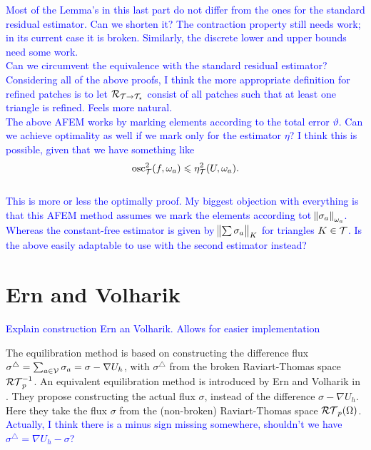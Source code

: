 \documentclass[thesis.tex]{subfiles}
\begin{document}
\textcolor{blue}{
  Most of the Lemma's in this last part do not differ from the ones for the standard residual estimator. Can we
  shorten it? The contraction property still needs work; in its current case it is broken.  Similarly,
  the discrete lower and upper bounds need some work. 
  \\
  Can we circumvent the equivalence with the standard residual estimator?
  \\
  Considering all of the above proofs, I think the more appropriate definition for refined patches is to let 
  $\mathcal{R}_{\mathcal{T} \to \mathcal{T}_\star}$ consist of all patches such that at least one triangle is refined. Feels more natural.
  \\
  The above AFEM works by marking elements according to the total error $\vartheta$. Can we achieve
  optimality as well if we mark only for the estimator $\eta$? I think this is possible, given that we have something like
  \[
    \operatorname{osc}_{\mathcal{T}}^2(f,\omega_a) \leqslant \eta_{\mathcal{T}}^2(U, \omega_a).
  \]
  \\
  This is more or less the optimally proof. My biggest objection with everything is that this AFEM method assumes
  we mark the elements according tot $\norm{\sigma_a}_{\omega_a}$. Whereas the constant-free
  estimator is given by $\norm{\sum \sigma_a}_{K}$ for triangles $K \in \mathcal{T}$.
Is the above easily adaptable to use with the second estimator instead?
}


\section{Ern and Volharik}
\textcolor{blue}{Explain construction Ern an Volharik. Allows for easier implementation}

The equilibration method is based on constructing the difference flux $\sigma^\triangle = \sum_{a \in \mathcal{V}} \sigma_a =  \sigma - \nabla U_h$,
with $\sigma^\triangle$ from the broken Raviart-Thomas space $\mathcal{RT}_p^{-1}$. 
An equivalent equilibration method is introduced by Ern and Volharik in \cite{ernequil}. They
propose constructing the actual flux $\sigma$, instead of the difference $\sigma - \nabla U_h$. Here
they take the flux $\sigma$ from the (non-broken) Raviart-Thomas space $\mathcal{RT}_p(\Omega)$.
\textcolor{blue}{Actually, I think there is a minus sign missing somewhere, shouldn't we have $\sigma^\triangle = \nabla U_h - \sigma$?}
\end{document}

